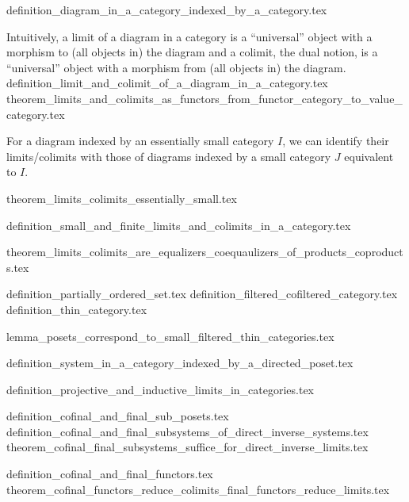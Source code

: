 {definition_diagram_in_a_category_indexed_by_a_category.tex}

Intuitively, a limit of a diagram in a category is a ``universal'' object with a morphism to (all objects in) the diagram and a colimit, the dual notion, is a ``universal'' object with a morphism from (all objects in) the diagram.
% 
{definition_limit_and_colimit_of_a_diagram_in_a_category.tex}
{theorem_limits_and_colimits_as_functors_from_functor_category_to_value_category.tex}

For a diagram indexed by an essentially small category $I$, we can identify their limits/colimits with those of diagrams indexed by a small category $J$ equivalent to $I$.

{theorem_limits_colimits_essentially_small.tex}


{definition_small_and_finite_limits_and_colimits_in_a_category.tex}

{theorem_limits_colimits_are_equalizers_coequaulizers_of_products_coproducts.tex}



{definition_partially_ordered_set.tex}
{definition_filtered_cofiltered_category.tex}
{definition_thin_category.tex}

{lemma_posets_correspond_to_small_filtered_thin_categories.tex}


{definition_system_in_a_category_indexed_by_a_directed_poset.tex}

{definition_projective_and_inductive_limits_in_categories.tex}

{definition_cofinal_and_final_sub_posets.tex}
{definition_cofinal_and_final_subsystems_of_direct_inverse_systems.tex}
{theorem_cofinal_final_subsystems_suffice_for_direct_inverse_limits.tex}

{definition_cofinal_and_final_functors.tex}
{theorem_cofinal_functors_reduce_colimits_final_functors_reduce_limits.tex}
